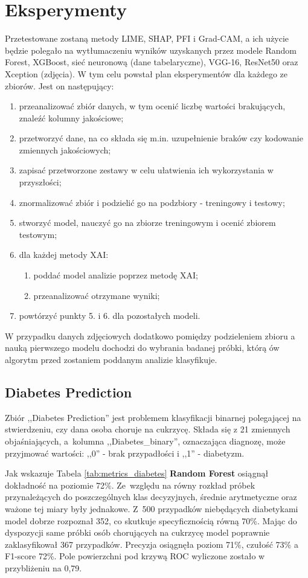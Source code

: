 \section{Eksperymenty}
Przetestowane zostaną metody LIME, SHAP, PFI i Grad-CAM, a ich użycie będzie polegało na wytłumaczeniu wyników uzyskanych przez modele Random Forest, XGBoost, sieć neuronową (dane tabelaryczne), VGG-16, ResNet50 oraz Xception (zdjęcia). W tym celu powstał plan eksperymentów dla każdego ze zbiorów. Jest on następujący:
\begin{enumerate}
    \item przeanalizować zbiór danych, w tym ocenić liczbę wartości brakujących, znaleźć kolumny jakościowe;
    \item przetworzyć dane, na co składa się m.in. uzupełnienie braków czy kodowanie zmiennych jakościowych;
    \item zapisać przetworzone zestawy w celu ułatwienia ich wykorzystania w przyszłości;
    \item znormalizować zbiór i podzielić go na podzbiory - treningowy i testowy;
    \item stworzyć model, nauczyć go na zbiorze treningowym i ocenić zbiorem testowym;
    \item dla każdej metody XAI:
    \begin{enumerate}
        \item poddać model analizie poprzez metodę XAI;
        \item przeanalizować otrzymane wyniki;
    \end{enumerate}
    \item powtórzyć punkty 5. i 6. dla pozostałych modeli.
\end{enumerate}
W przypadku danych zdjęciowych dodatkowo pomiędzy podzieleniem zbioru a nauką pierwszego modelu dochodzi do wybrania badanej próbki, którą ów algorytm przed zostaniem poddanym analizie klasyfikuje.

\subsection{Diabetes Prediction}
Zbiór ,,Diabetes Prediction'' jest problemem klasyfikacji binarnej polegającej na stwierdzeniu, czy dana osoba choruje na cukrzycę. Składa się z 21 zmiennych objaśniających, a~kolumna ,,Diabetes\_binary'', oznaczająca diagnozę, może przyjmować wartości: ,,0'' - brak przypadłości i ,,1'' - diabetyzm.

Jak wskazuje Tabela \ref{tab:metrics_diabetes} \textbf{Random Forest} osiągnął dokładność na poziomie 72\%. Ze~względu na równy rozkład próbek przynależących do poszczególnych klas decyzyjnych, średnie arytmetyczne oraz ważone tej miary były jednakowe. Z~500 przypadków niebędących diabetykami model dobrze rozpoznał 352, co skutkuje specyficznością równą 70\%. Mając do dyspozycji same próbki osób chorujących na cukrzycę model poprawnie zaklasyfikował 367 przypadków. Precyzja osiągnęła poziom 71\%, czułość 73\% a F1-score 72\%. Pole powierzchni pod krzywą ROC wyliczone zostało w przybliżeniu na 0,79. 

